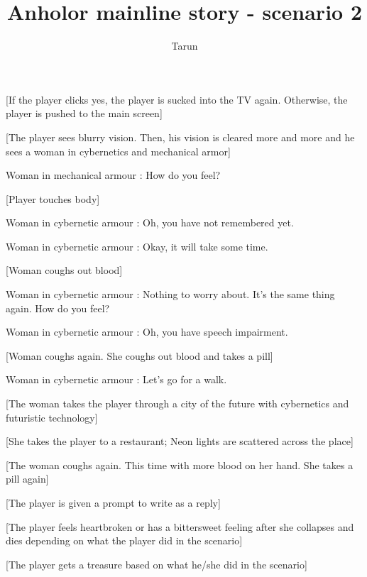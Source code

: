 \documentclass[a4paper,12pt]{article}
\author {Tarun}
\title {Anholor mainline story - scenario 2}
\begin{document}
\newline
[Continue?]\newline
[Yes/No?]\newline

[If the player clicks yes, the player is sucked into the TV again. Otherwise, the player is pushed to the main screen]\newline

[The player sees blurry vision. Then, his vision is cleared more and more and he sees a woman in cybernetics and mechanical armor]\newline

Woman in mechanical armour : How do you feel?\newline

[Player touches body]\newline

Woman in cybernetic armour : Oh, you have not remembered yet.\newline

Woman in cybernetic armour : Okay, it will take some time.\newline

[Woman coughs out blood]\newline

Woman in cybernetic armour : Nothing to worry about. It's the same thing again. How do you feel? \newline

Woman in cybernetic armour : Oh, you have speech impairment.\newline

[Woman coughs again. She coughs out blood and takes a pill]\newline

Woman in cybernetic armour : Let's go for a walk.\newline

[The woman takes the player through a city of the future with cybernetics and futuristic technology]\newline

[She takes the player to a restaurant; Neon lights are scattered across the place]\newline

[The woman coughs again. This time with more blood on her hand. She takes a pill again]\newline

[The player is given a prompt to write as a reply]\newline

[The player feels heartbroken or has a bittersweet feeling after she collapses and dies depending on what the player did in the scenario]\newline

[The player gets a treasure based on what he/she did in the scenario]\newline
\end{document}
